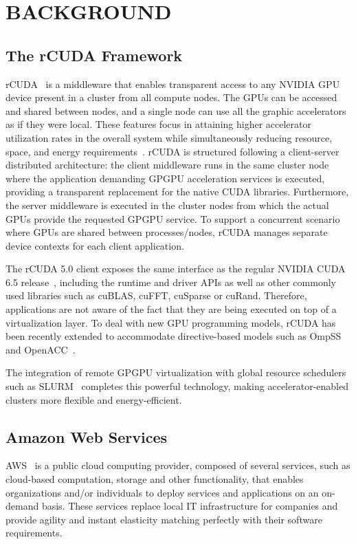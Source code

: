 \documentclass[a4paper,twoside]{article}
\begin{document}
\section{\uppercase{Background}}
\label{sec:background}
\subsection{The rCUDA Framework}
\label{sec:rcuda}
{rCUDA}~\cite{toniparco} is a middleware that enables transparent access
to any NVIDIA GPU device present in a cluster from all compute
nodes. The GPUs can be accessed and shared between nodes, and a single node can use all the graphic accelerators
as if they were local.
These features focus in attaining higher accelerator utilization rates in the overall system while simultaneously reducing
resource, space, and energy requirements~\cite{energy14}.
rCUDA is structured following a client-server distributed
architecture: the client middleware runs in the same cluster node where the application demanding GPGPU
acceleration services is executed, providing a transparent replacement for the
native CUDA libraries. Furthermore, the server middleware is executed in the
cluster nodes from which the actual GPUs provide the requested GPGPU service.
To support a concurrent scenario where GPUs are shared between
processes\slash nodes, {rCUDA} manages separate device contexts for
each client application.

The {rCUDA} 5.0 client exposes the same interface as the regular NVIDIA
CUDA 6.5 release~\cite{cuda65}, including the runtime and driver
APIs as well as other commonly used libraries such as cuBLAS, cuFFT, cuSparse or cuRand.
Therefore, applications are not aware of the fact that they are being executed
on top of a virtualization layer.
To deal with new GPU programming models, {rCUDA} has been recently extended to accommodate 
directive-based models such as OmpSS~\cite{repara15} and OpenACC~\cite{cluster15}.

The integration of remote GPGPU virtualization with global
resource schedulers such as SLURM~\cite{sbacpad14} completes this powerful
technology, making accelerator-enabled clusters more flexible and
energy-efficient.

\subsection{Amazon Web Services}
\label{sec:aws}
AWS~\cite{aws} is a public cloud computing provider, 
composed of several services, such as 
 cloud-based computation, storage and other functionality, 
that enables organizations and/or individuals to deploy
services and applications on an on-demand basis. 
These services replace local IT infrastructure for companies and provide agility and instant elasticity matching 
perfectly with their software requirements.
\end{document}
